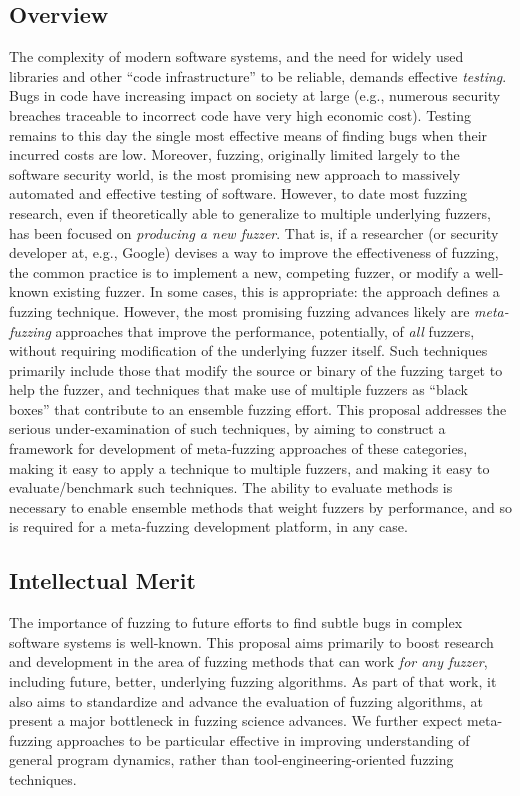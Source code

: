 \centerline{}


\cut{
}

\subsection*{Overview}
\vspace{-2mm}
The complexity of modern software systems, and the need for widely used 
libraries and other ``code infrastructure'' to be reliable, demands effective 
\emph{testing}.  Bugs in code have increasing impact on society at large (e.g., 
numerous security breaches traceable to incorrect code have very high economic 
cost).  Testing remains to this day the single most effective means of finding 
bugs when their incurred costs are low.   Moreover, fuzzing, originally limited largely to 
the software security world, is the most promising new approach to massively 
automated and effective testing of software.   However, to date most fuzzing 
research, even if theoretically able to generalize to multiple underlying 
fuzzers, has been focused on \emph{producing a new fuzzer}.  That is, if a 
researcher (or security developer at, e.g., Google) devises a way to improve 
the effectiveness of fuzzing, the common practice is to implement a new, 
competing fuzzer, or modify a well-known existing fuzzer.  In some cases, this 
is appropriate: the approach defines a fuzzing technique.  However, the most 
promising fuzzing advances likely are \emph{meta-fuzzing} approaches that 
improve the performance, potentially, of \emph{all} fuzzers, without requiring 
modification of the underlying fuzzer itself.  Such techniques primarily 
include those that modify the source or binary of the fuzzing target to help 
the fuzzer, and techniques that make use of multiple fuzzers as ``black boxes'' 
that contribute to an ensemble fuzzing effort.  This proposal addresses the 
serious under-examination of such techniques, by aiming to construct a 
framework for development of meta-fuzzing approaches of these categories, 
making it easy to apply a technique to multiple fuzzers, and making it easy to 
evaluate/benchmark such techniques.  The ability to evaluate methods is 
necessary to enable ensemble methods that weight fuzzers by performance, and so 
is required for a meta-fuzzing development platform, in any case.

\subsection*{Intellectual Merit} 
\vspace{-2mm}
The importance of fuzzing to future efforts to find subtle bugs in complex 
software systems is well-known.  This proposal aims primarily to boost research 
and development in the area of fuzzing methods that can work \emph{for any 
fuzzer}, including future, better, underlying fuzzing algorithms.  As part of 
that work, it also aims to standardize and advance the evaluation of fuzzing 
algorithms, at present a major bottleneck in fuzzing science advances.  We 
further expect meta-fuzzing approaches to be particular effective in improving 
understanding of general program dynamics, rather than 
tool-engineering-oriented fuzzing techniques.

